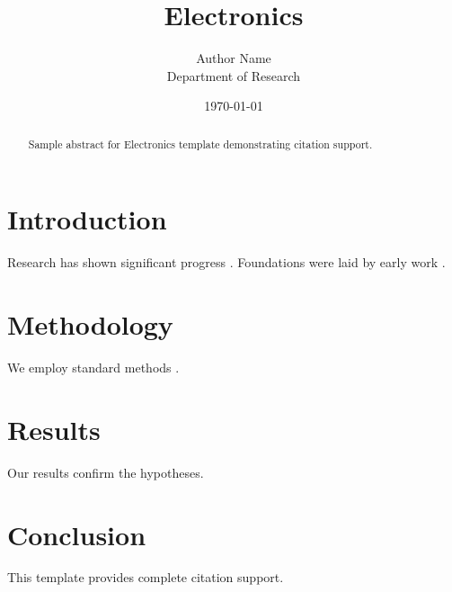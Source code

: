 \documentclass{mdpi}
\title{Electronics}
\author{Author Name \\ \small Department of Research}
\date{\today}
\begin{document}
\maketitle

\begin{abstract}
Sample abstract for Electronics template demonstrating citation support.
\end{abstract}

\section{Introduction}
Research has shown significant progress \citep{einstein1905}. Foundations were laid by early work \citep{turing1950}.

\section{Methodology}
We employ standard methods \citep{knuth1984}.

\section{Results}
Our results confirm the hypotheses.

\section{Conclusion}
This template provides complete citation support.



\end{document}
